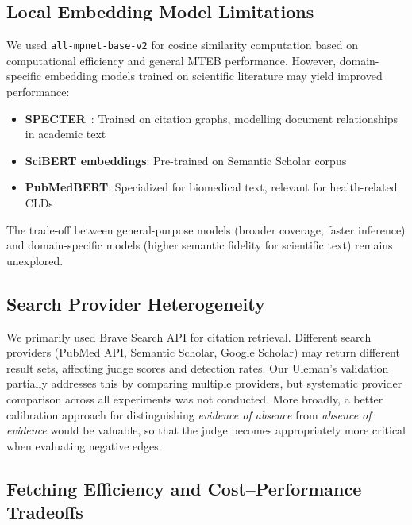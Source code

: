 \subsection{Local Embedding Model Limitations}

We used \texttt{all-mpnet-base-v2} for cosine similarity computation based on computational efficiency and general MTEB performance. However, domain-specific embedding models trained on scientific literature may yield improved performance:
\begin{itemize}[noitemsep]
    \item \textbf{SPECTER}~\citep{cohan2020specter}: Trained on citation graphs, modelling document relationships in academic text
    \item \textbf{SciBERT embeddings}: Pre-trained on Semantic Scholar corpus
    \item \textbf{PubMedBERT}: Specialized for biomedical text, relevant for health-related CLDs
\end{itemize}

The trade-off between general-purpose models (broader coverage, faster inference) and domain-specific models (higher semantic fidelity for scientific text) remains unexplored.

\subsection{Search Provider Heterogeneity}

We primarily used Brave Search API for citation retrieval. Different search providers (PubMed API, Semantic Scholar, Google Scholar) may return different result sets, affecting judge scores and detection rates. Our Uleman's validation partially addresses this by comparing multiple providers, but systematic provider comparison across all experiments was not conducted. More broadly, a better calibration approach for distinguishing \textit{evidence of absence} from \textit{absence of evidence} would be valuable, so that the judge becomes appropriately more critical when evaluating negative edges.

\subsection{Fetching Efficiency and Cost--Performance Tradeoffs}

